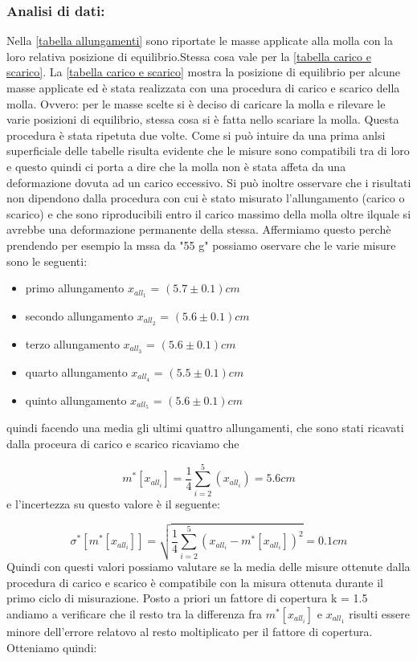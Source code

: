 \subsubsection{Analisi di dati:}
Nella \ref{tabella allungamenti} sono riportate le masse applicate alla molla con la loro relativa posizione di equilibrio.Stessa cosa vale per la \ref{tabella carico e scarico}.
La \ref{tabella carico e scarico} mostra la posizione di equilibrio per alcune masse applicate ed è stata realizzata con una procedura di carico e scarico della molla. Ovvero: per le masse scelte si è deciso di caricare la molla e rilevare le varie posizioni di equilibrio, stessa cosa si è fatta nello scariare la molla. Questa procedura è stata ripetuta due volte.
Come si può intuire da una prima anlsi superficiale delle tabelle risulta evidente che le misure sono compatibili tra di loro e questo quindi ci porta a dire che la molla non è stata affeta da una deformazione dovuta ad un carico eccessivo. Si può inoltre osservare che i risultati non dipendono dalla procedura con cui è stato misurato l'allungamento (carico o scarico) e che sono riproducibili entro il carico massimo della molla oltre ilquale si avrebbe una deformazione permanente della stessa.
Affermiamo questo perchè prendendo per esempio la mssa da "55 g" possiamo oservare che le varie misure sono le seguenti:
\begin{itemize}
	\item{primo allungamento $x_{all_1}$ = $(5.7 \pm 0.1) cm$}
	\item{secondo allungamento $x_{all_2}$ = $(5.6 \pm 0.1) cm$}
	\item{terzo allungamento $x_{all_3}$ = $(5.6 \pm 0.1) cm$}
	\item{quarto allungamento $x_{all_4}$ = $(5.5 \pm 0.1) cm$}
	\item{quinto allungamento $x_{all_5}$ = $(5.6 \pm 0.1) cm$}
\end{itemize}
quindi facendo una media gli ultimi quattro allungamenti, che sono stati ricavati dalla proceura di carico e scarico ricaviamo che

\begin{equation*}
	m^*[x_{all_i}] = \frac{1}{4} \sum_{i=2}^{5} (x_{all_i}) = 5.6 cm
\end{equation*}
e l'incertezza su questo valore è il seguente:

\begin{equation}
	\sigma^*[m^*[x_{all_i}]] = \sqrt{\frac{1}{4} \sum_{i=2}^{5} (x_{all_i} - m^*[x_{all_i}])^2} = 0.1 cm
\end{equation}
Quindi con questi valori possiamo valutare se la media delle misure ottenute dalla procedura di carico e scarico è compatibile con la misura ottenuta durante il primo ciclo di misurazione. Posto a priori un fattore di copertura k = 1.5 andiamo a verificare che il resto tra la differenza fra $m^*[x_{all_i}]$ e $x_{all_1}$ risulti essere minore dell'errore relatovo al resto moltiplicato per il fattore di copertura.
Otteniamo quindi:

